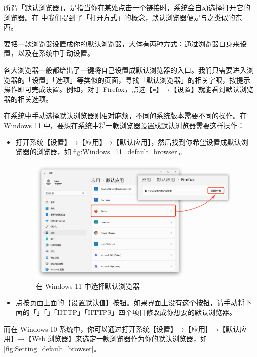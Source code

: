 所谓「默认浏览器」，是指当你在某处点击一个链接时，系统会自动选择打开它的浏览器。在 中我们提到了「打开方式」的概念，默认浏览器便是与之类似的东西。

要把一款浏览器设置成你的默认浏览器，大体有两种方式：通过浏览器自身来设置，以及在系统中手动设置。

各大浏览器一般都给出了一键将自己设置成默认浏览器的入口。我们只需要进入浏览器的「设置」「选项」等类似的页面，寻找「默认浏览器」的相关字眼，按提示操作即可完成设置。例如，对于 Firefox，点选【≡】→【设置】就能看到默认浏览器的相关选项。

在系统中手动选择默认浏览器则相对麻烦，不同的系统版本需要不同的操作。在 Windows 11 中，要想在系统中将一款浏览器设置成默认浏览器需要这样操作：

\begin{itemize}
  \item 打开系统【设置】→【应用】→【默认应用】，然后找到你希望设置成默认浏览器的浏览器，如\autoref{fig:Windows_11_default_browser}。
    \begin{figure}[htb!]
      \centering
      \includegraphics[width=.8\textwidth]{assets/software/Windows_11_default_browser.png}
      \caption{在 Windows 11 中选择默认浏览器}
      \label{fig:Windows_11_default_browser}
    \end{figure}
  \item 点按页面上面的【设置默认值】按钮。如果界面上没有这个按钮，请手动将下面的「」「」\linebreak「HTTP」「HTTPS」四个项目修改成你想要的默认浏览器。
\end{itemize}

而在 Windows 10 系统中，你可以通过打开系统【设置】→【应用】→【默认应用】→【Web 浏览器】来选定一款浏览器作为你的默认浏览器，如\autoref{fig:Setting_default_browser}。

